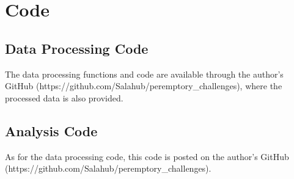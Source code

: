 \chapter{Code}
\label{app:code}

\section{Data Processing Code}\label{app:proccode}
The data processing functions and code are available through the author's GitHub
(https://github.com/Salahub/peremptory\_challenges), where the processed data is also provided.

%

\section{Analysis Code} \label{app:analysis}
As for the data processing code, this code is posted on the author's GitHub (https://github.com/Salahub/peremptory\_challenges).

%
